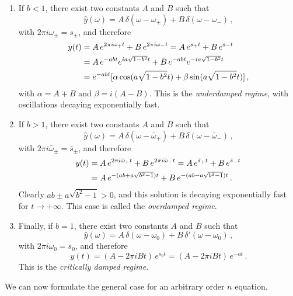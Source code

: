 \begin{enumerate}
  \item If $b<1$, there exist two constants $A$ and $B$ such that
    \begin{equation}
      \hat{y}(\omega)=A\,\delta(\omega-\omega_+)+B\,\delta(\omega-\omega_-)\,,
    \end{equation}
    with $2\pi i\omega_{\pm}=s_\pm$, and therefore
    \begin{align}
      y(t)&=A\,e^{2\pi i\omega_+ t}+B\,e^{2\pi i\omega_- t}
      =A\,e^{s_+ t}+B\,e^{s_- t}
      \notag\\
      &=A\,e^{-abt}e^{ia\sqrt{1-b^2}t}+B\,e^{-abt}e^{-ia\sqrt{1-b^2}t}\notag\\
      &=e^{-abt}[\alpha\cos(a\sqrt{1-b^2}t)+\beta\sin(a\sqrt{1-b^2}t)]\,,
      \label{eq:ode2-damped-under}
    \end{align}
    with $\alpha=A+B$ and $\beta=i(A-B)$. This is the \emph{underdamped regime}, with
    oscillations decaying exponentially fast.
  \item If $b>1$, there exist two constants $A$ and $B$ such that
    \begin{equation}
      \hat{y}(\omega)=A\,\delta(\omega-\bar{\omega}_+)+B\,\delta(\omega-\bar{\omega}_-)\,,
    \end{equation}
    with $2\pi i\bar{\omega}_{\pm}=\bar{s}_\pm$, and therefore
    \begin{align}
      y(t)&=A\,e^{2\pi i\bar{\omega}_+ t}+B\,e^{2\pi i\bar{\omega}_- t}
      =A\,e^{\bar{s}_+ t}+B\,e^{\bar{s}_- t}\notag\\
      &=A\,e^{-(ab+a\sqrt{b^2-1})t}+B\,e^{-(ab-a\sqrt{b^2-1})t}\,.
      \label{eq:ode2-damped-over}
    \end{align}
    Clearly $ab\pm a\sqrt{b^2-1}>0$, and this solution is decaying exponentially fast for
    $t\to+\infty$. This case is called the \emph{overdamped regime}.
  \item Finally, if $b=1$, there exist two constants $A$ and $B$ such that
    \begin{equation}
      \hat{y}(\omega)=A\,\delta(\omega-\omega_0)+B\,\delta'(\omega-\omega_0)\,,
    \end{equation}
    with $2\pi i\omega_{0}=s_0$, and therefore
    \begin{equation}
      y(t)=(A-2\pi i Bt)\,e^{s_0 t}
      =(A-2\pi i Bt)\,e^{-at}\,.
      \label{eq:ode2-damped-crit}
    \end{equation}
    This is the \emph{critically damped regime}.
\end{enumerate}
We can now formulate the general case for an arbitrary order $n$ equation.
